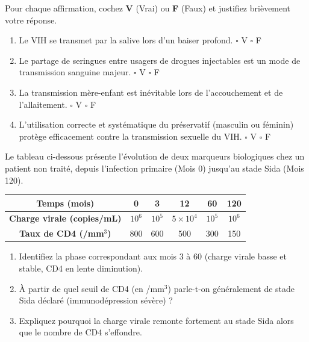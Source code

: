 \documentclass[11pt]{article}
\begin{document}
\begin{exercice}
Pour chaque affirmation, cochez \textbf{V} (Vrai) ou \textbf{F} (Faux) et justifiez brièvement votre réponse.
\begin{enumerate}
    \item Le VIH se transmet par la salive lors d'un baiser profond. \hfill $\square$ V \quad $\square$ F
    \item Le partage de seringues entre usagers de drogues injectables est un mode de transmission sanguine majeur. \hfill $\square$ V \quad $\square$ F
    \item La transmission mère-enfant est inévitable lors de l'accouchement et de l'allaitement. \hfill $\square$ V \quad $\square$ F
    \item L'utilisation correcte et systématique du préservatif (masculin ou féminin) protège efficacement contre la transmission sexuelle du VIH. \hfill $\square$ V \quad $\square$ F
\end{enumerate}
\end{exercice}

\begin{exercice}
Le tableau ci-dessous présente l'évolution de deux marqueurs biologiques chez un patient non traité, depuis l'infection primaire (Mois 0) jusqu'au stade Sida (Mois 120).
\begin{center}
\begin{tabular}{|c|c|c|c|c|c|}
\hline
\textbf{Temps (mois)} & 0 & 3 & 12 & 60 & 120 \\
\hline
\textbf{Charge virale (copies/mL)} & $10^6$ & $10^5$ & $5 \times 10^4$ & $10^5$ & $10^6$ \\
\hline
\textbf{Taux de CD4 (/mm$^3$)} & 800 & 600 & 500 & 300 & 150 \\
\hline
\end{tabular}
\end{center}
\begin{enumerate}
    \item Identifiez la phase correspondant aux mois 3 à 60 (charge virale basse et stable, CD4 en lente diminution).
    \item À partir de quel seuil de CD4 (en /mm$^3$) parle-t-on généralement de stade Sida déclaré (immunodépression sévère) ?
    \item Expliquez pourquoi la charge virale remonte fortement au stade Sida alors que le nombre de CD4 s'effondre.
\end{enumerate}
\end{exercice}
\end{document}
